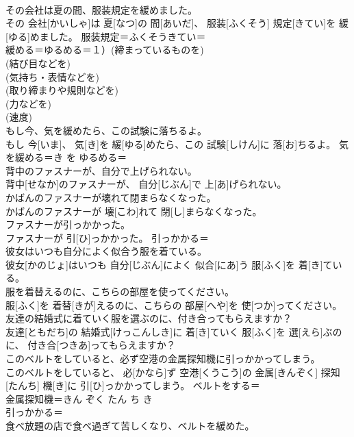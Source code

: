 \documentclass[8pt]{extreport}
\begin{document}
\begin{CJK}{UTF8}{min}
\\	その会社は夏の間、服装規定を緩めました。	
\\	その 会社[かいしゃ]は 夏[なつ]の 間[あいだ]、 服装[ふくそう] 規定[きてい]を 緩[ゆる]めました。	服装規定＝ふくそうきてい＝ 
\\	緩める＝ゆるめる＝１）(締まっているものを) 
\\	(結び目などを) 
\\	(気持ち・表情などを) 
\\	(取り締まりや規則などを) 
\\	(力などを) 
\\	(速度) 
\\	もし今、気を緩めたら、この試験に落ちるよ。	
\\	もし 今[いま]、 気[き]を 緩[ゆる]めたら、この 試験[しけん]に 落[お]ちるよ。	気を緩める＝き を ゆるめる＝ 
\\	背中のファスナーが、自分で上げられない。	
\\	背中[せなか]のファスナーが、 自分[じぶん]で 上[あ]げられない。	
\\	かばんのファスナーが壊れて閉まらなくなった。	
\\	かばんのファスナーが 壊[こわ]れて 閉[し]まらなくなった。	
\\	ファスナーが引っかかった。	
\\	ファスナーが 引[ひ]っかかった。	引っかかる＝ 
\\	彼女はいつも自分によく似合う服を着ている。	
\\	彼女[かのじょ]はいつも 自分[じぶん]によく 似合[にあ]う 服[ふく]を 着[き]ている。	
\\	服を着替えるのに、こちらの部屋を使ってください。	
\\	服[ふく]を 着替[きが]えるのに、こちらの 部屋[へや]を 使[つか]ってください。	
\\	友達の結婚式に着ていく服を選ぶのに、付き合ってもらえますか？	
\\	友達[ともだち]の 結婚式[けっこんしき]に 着[き]ていく 服[ふく]を 選[えら]ぶのに、 付き合[つきあ]ってもらえますか？	
\\	このベルトをしていると、必ず空港の金属探知機に引っかかってしまう。	
\\	このベルトをしていると、 必[かなら]ず 空港[くうこう]の 金属[きんぞく] 探知[たんち] 機[き]に 引[ひ]っかかってしまう。	ベルトをする＝ 
\\	金属探知機＝きん ぞく たん ち き 
\\	引っかかる＝ 
\\	食べ放題の店で食べ過ぎて苦しくなり、ベルトを緩めた。	

\end{CJK}
\end{document}

